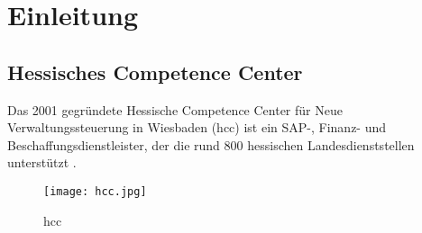 \section{Einleitung}
\subsection{Hessisches Competence Center}
Das 2001 gegründete Hessische Competence Center für Neue Verwaltungssteuerung in Wiesbaden (\acrshort{hcc}) ist ein SAP-,
Finanz- und Beschaffungsdienstleister,
der die rund 800 hessischen Landesdienststellen unterstützt \cite{hcc-ueber-uns}.

\begin{figure}[H]
    \centering
    \texttt{[image: hcc.jpg]}
    \caption{\acrlong{hcc}}
\end{figure}

\clearpage